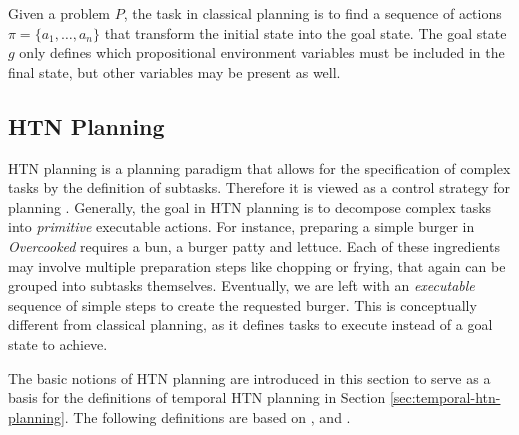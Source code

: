 Given a problem $P$, the task in classical planning is to find a sequence of actions $\pi = \{a_1,\dots,a_n\}$ that transform the initial state into the goal state.
The goal state $g$ only defines which propositional environment variables must be included in the final state, but other variables may be present as well.

\subsection{HTN Planning}\label{sec:htn-planning}

\acf{HTN} planning is a planning paradigm that allows for the specification of complex tasks by the definition of subtasks.
Therefore it is viewed as a control strategy for planning \citep[chap.~11]{ghallabAutomatedPlanningTheory2004}.
Generally, the goal in \ac{HTN} planning is to decompose complex tasks into \textit{primitive} executable actions.
For instance, preparing a simple burger in \textit{Overcooked} requires a bun, a burger patty and lettuce.
Each of these ingredients may involve multiple preparation steps like chopping or frying, that again can be grouped into subtasks themselves.
Eventually, we are left with an \textit{executable} sequence of simple steps to create the requested burger.
This is conceptually different from classical planning, as it defines tasks to execute instead of a goal state to achieve.

The basic notions of HTN planning are introduced in this section to serve as a basis for the definitions of temporal \ac{HTN} planning in Section \ref{sec:temporal-htn-planning}.
The following definitions are based on \citet[chap.~11]{ghallabAutomatedPlanningTheory2004}, \cite{hollerGuidingSearchHTN2019} and \cite{bit-monnotTemporalHierarchicalModels2016a}.




